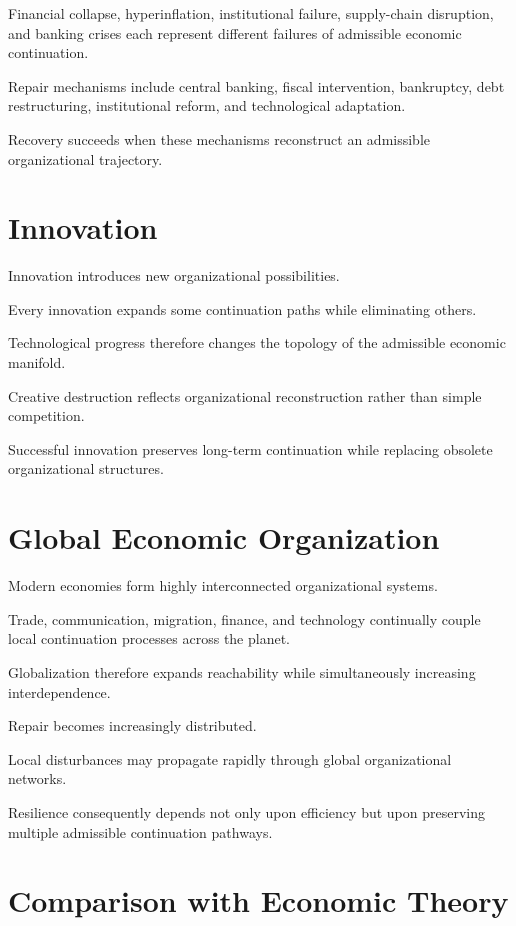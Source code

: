 \documentclass[11pt,oneside]{book}
\numberwithin{equation}{chapter}
\theoremstyle{definition}
\theoremstyle{plain}
\begin{document}
Financial collapse, hyperinflation, institutional failure, supply-chain
disruption, and banking crises each represent different failures of
admissible economic continuation.

Repair mechanisms include central banking, fiscal intervention,
bankruptcy, debt restructuring, institutional reform, and technological
adaptation.

Recovery succeeds when these mechanisms reconstruct an admissible
organizational trajectory.

\section{Innovation}

Innovation introduces new organizational possibilities.

Every innovation expands some continuation paths while eliminating others.

Technological progress therefore changes the topology of the admissible
economic manifold.

Creative destruction reflects organizational reconstruction rather than
simple competition.

Successful innovation preserves long-term continuation while replacing
obsolete organizational structures.

\section{Global Economic Organization}

Modern economies form highly interconnected organizational systems.

Trade, communication, migration, finance, and technology continually
couple local continuation processes across the planet.

Globalization therefore expands reachability while simultaneously
increasing interdependence.

Repair becomes increasingly distributed.

Local disturbances may propagate rapidly through global organizational
networks.

Resilience consequently depends not only upon efficiency but upon
preserving multiple admissible continuation pathways.

\section{Comparison with Economic Theory}
\end{document}
